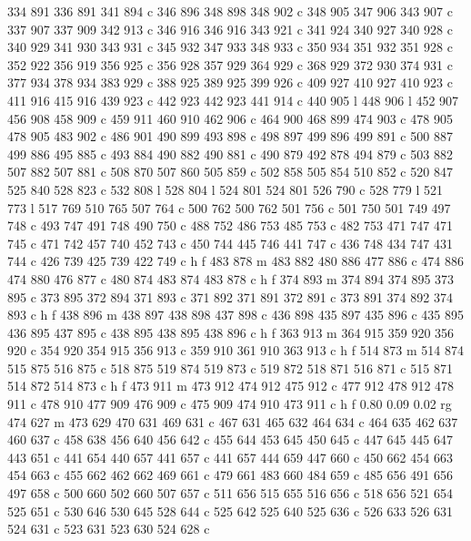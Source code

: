 {{   334 891 336 891 341 894 c
   346 896 348 898 348 902 c
   348 905 347 906 343 907 c
   337 907 337 909 342 913 c
   346 916 346 916 343 921 c
   341 924 340 927 340 928 c
   340 929 341 930 343 931 c
   345 932 347 933 348 933 c
   350 934 351 932 351 928 c
   352 922 356 919 356 925 c
   356 928 357 929 364 929 c
   368 929 372 930 374 931 c
   377 934 378 934 383 929 c
   388 925 389 925 399 926 c
   409 927 410 927 410 923 c
   411 916 415 916 439 923 c
   442 923 442 923 441 914 c
   440 905 l
   448 906 l
   452 907 456 908 458 909 c
   459 911 460 910 462 906 c
   464 900 468 899 474 903 c
   478 905 478 905 483 902 c
   486 901 490 899 493 898 c
   498 897 499 896 499 891 c
   500 887 499 886 495 885 c
   493 884 490 882 490 881 c
   490 879 492 878 494 879 c
   503 882 507 882 507 881 c
   508 870 507 860 505 859 c
   502 858 505 854 510 852 c
   520 847 525 840 528 823 c
   532 808 l
   528 804 l
   524 801 524 801 526 790 c
   528 779 l
   521 773 l
   517 769 510 765 507 764 c
   500 762 500 762 501 756 c
   501 750 501 749 497 748 c
   493 747 491 748 490 750 c
   488 752 486 753 485 753 c
   482 753 471 747 471 745 c
   471 742 457 740 452 743 c
   450 744 445 746 441 747 c
   436 748 434 747 431 744 c
   426 739 425 739 422 749 c
   h f
   483 878 m
   483 882 480 886 477 886 c
   474 886 474 880 476 877 c
   480 874 483 874 483 878 c
   h f
   374 893 m
   374 894 374 895 373 895 c
   373 895 372 894 371 893 c
   371 892 371 891 372 891 c
   373 891 374 892 374 893 c
   h f
   438 896 m
   438 897 438 898 437 898 c
   436 898 435 897 435 896 c
   435 895 436 895 437 895 c
   438 895 438 895 438 896 c
   h f
   363 913 m
   364 915 359 920 356 920 c
   354 920 354 915 356 913 c
   359 910 361 910 363 913 c
   h f
   514 873 m
   514 874 515 875 516 875 c
   518 875 519 874 519 873 c
   519 872 518 871 516 871 c
   515 871 514 872 514 873 c
   h f
   473 911 m
   473 912 474 912 475 912 c
   477 912 478 912 478 911 c
   478 910 477 909 476 909 c
   475 909 474 910 473 911 c
   h f
   0.80 0.09 0.02 rg
   474 627 m
   473 629 470 631 469 631 c
   467 631 465 632 464 634 c
   464 635 462 637 460 637 c
   458 638 456 640 456 642 c
   455 644 453 645 450 645 c
   447 645 445 647 443 651 c
   441 654 440 657 441 657 c
   441 657 444 659 447 660 c
   450 662 454 663 454 663 c
   455 662 462 662 469 661 c
   479 661 483 660 484 659 c
   485 656 491 656 497 658 c
   500 660 502 660 507 657 c
   511 656 515 655 516 656 c
   518 656 521 654 525 651 c
   530 646 530 645 528 644 c
   525 642 525 640 525 636 c
   526 633 526 631 524 631 c
   523 631 523 630 524 628 c
}}
